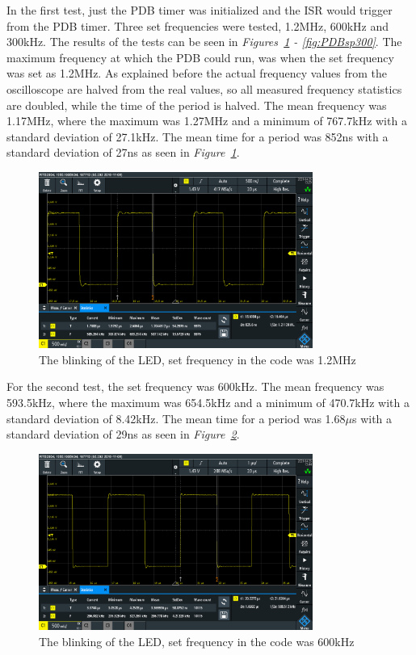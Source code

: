 In the first test, just the PDB timer was initialized and the ISR would trigger from the PDB timer.
Three set frequencies were tested, 1.2MHz, 600kHz and 300kHz.
The results of the tests can be seen in \textit{Figures~\ref{fig:PDBSp1200} - \ref{fig:PDBsp300}}.
The maximum frequency at which the PDB could run, was when the set frequency was set as 1.2MHz.
As explained before the actual frequency values from the oscilloscope are halved from the real values, so all measured frequency statistics are doubled, while the time of the period is halved.
The mean frequency was 1.17MHz, where the maximum was 1.27MHz and a minimum of 767.7kHz with a standard deviation of 27.1kHz. 
The mean time for a period was 852ns with a standard deviation of 27ns as seen in \textit{Figure~\ref{fig:PDBSp1200}}.

\clearpage

\begin{figure}[h]
    \centering
    \includegraphics[width=0.8\textwidth]{graphics/STAT01_1200.PNG}
    \caption{The blinking of the LED, set frequency in the code was 1.2MHz}
    \label{fig:PDBSp1200}
\end{figure}

For the second test, the set frequency was 600kHz.
The mean frequency was 593.5kHz, where the maximum was 654.5kHz and a minimum of 470.7kHz with a standard deviation of 8.42kHz. 
The mean time for a period was 1.68$\mu$s with a standard deviation of 29ns as seen in \textit{Figure~\ref{fig:PDBSp600}}.

\begin{figure}[h]
    \centering
    \includegraphics[width=0.8\textwidth]{graphics/STAT02_600.PNG}
    \caption{The blinking of the LED, set frequency in the code was 600kHz}
    \label{fig:PDBSp600}
\end{figure}

